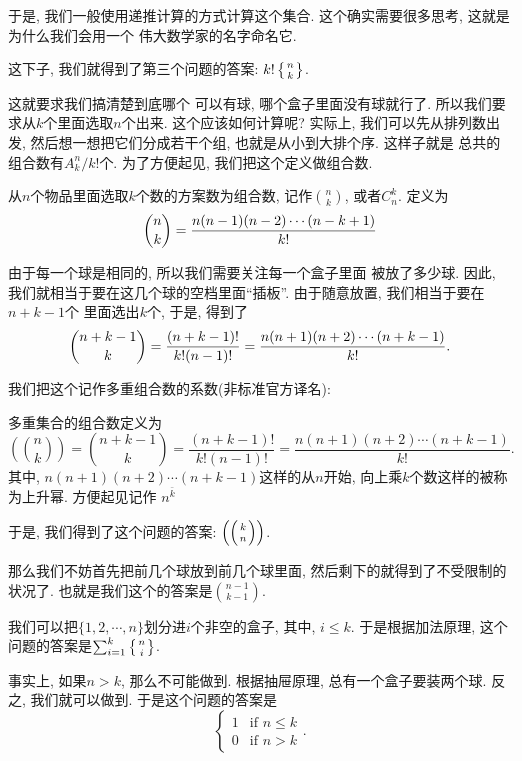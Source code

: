 于是, 我们一般使用递推计算的方式计算这个集合. 这个确实需要很多思考, 这就是为什么我们会用一个
伟大数学家的名字命名它. 

这下子, 我们就得到了第三个问题的答案: $k! \left\{{n \atop k}\right\}$. 

 这就要求我们搞清楚到底哪个
可以有球, 哪个盒子里面没有球就行了. 所以我们要求从$k$个里面选取$n$个出来. 这个应该如何计算呢? 
实际上, 我们可以先从排列数出发, 然后想一想把它们分成若干个组, 也就是从小到大排个序. 这样子就是
总共的组合数有$A_k^n/k!$个. 为了方便起见, 我们把这个定义做组合数. 

\begin{definition}[组合数]
  从$n$个物品里面选取$k$个数的方案数为组合数, 记作${n\choose k}$, 或者$C_n^k$. 定义为
  $$
  {n\choose k}={n(n-1)(n-2)\cdots(n-k+1)\over k!}
  $$
\end{definition}


 由于每一个球是相同的, 所以我们需要关注每一个盒子里面
被放了多少球. 因此, 我们就相当于要在这几个球的空档里面``插板''. 由于随意放置, 我们相当于要在$n+k-1$个
里面选出$k$个, 于是, 得到了
$$
{n+k-1\choose k} = \frac{(n+k-1)!}{k!(n-1)!} = {n(n+1)(n+2)\cdots(n+k-1)\over k!}.
$$

我们把这个记作多重组合数的系数(非标准官方译名): 

\begin{definition}[多重集合组合数]
  多重集合的组合数定义为
  $$
  \left(\binom nk\right)=\binom{n+k-1}k=\frac{(n+k-1)!}{k!\left(n-1\right)!}=\frac{n(n+1)(n+2)\cdots(n+k-1)}{k!}.
  $$
  其中, $n(n+1)(n+2)\cdots(n+k-1)$这样的从$n$开始, 向上乘$k$个数这样的被称为上升幂. 方便起见记作
  $n^{\bar k}$
\end{definition}
于是, 我们得到了这个问题的答案: $\left(\left({k \atop n}\right)\right)$. 

 那么我们不妨首先把前几个球放到前几个球里面, 
然后剩下的就得到了不受限制的状况了. 也就是我们这个的答案是${n-1\choose k-1}. $

 我们可以把$\{1,2,\cdots,n\}$划分进$i$个非空的盒子, 
其中, $i\leq k$. 于是根据加法原理, 这个问题的答案是$\sum_{i=1}^{k}\left\{{n \atop i}\right\}$. 

 事实上, 如果$n>k$, 那么不可能做到.
根据抽屉原理, 总有一个盒子要装两个球. 反之, 我们就可以做到. 于是这个问题的答案是$$\begin{cases}1 & \text{if }n\leq k\\ 0& \text{if }n>k\end{cases}.$$

